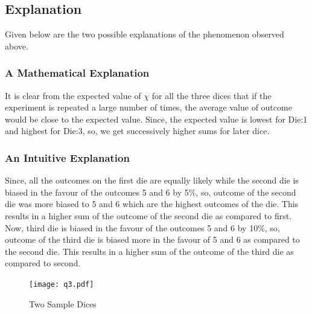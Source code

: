 \documentclass[a4paper, 12pt]{article}
\begin{document}
\subsection{Explanation}
Given below are the two possible explanations of the phenomenon observed above.

\subsubsection{A Mathematical Explanation}
It is clear from the expected value of $\chi$ for all the three dices that if the experiment is repeated a large number of times, the average value of outcome would be close to the expected value. Since, the expected value is lowest for Die:1 and highest for Die:3, so, we get successively higher sums for later dice.

\subsubsection{An Intuitive Explanation}   
Since, all the outcomes on the first die are equally likely while the second die is biased in the favour of the outcomes 5 and 6 by 5\%, so, outcome of the second die was more biased to 5 and 6 which are the highest outcomes of the die. This results in a higher sum of the outcome of the second die as compared to first.\\
Now, third die is biased in the favour of the outcomes 5 and 6 by 10\%, so, outcome of the third die is biased more in the favour of 5 and 6 as compared to the second die. This results in a higher sum of the outcome of the third die as compared to second.  

\begin{figure}[ht]\centering
\texttt{[image: q3.pdf]}
\caption{Two Sample Dices}
\label{fig:figure2}
\end{figure}

\printindex
\end{document}

